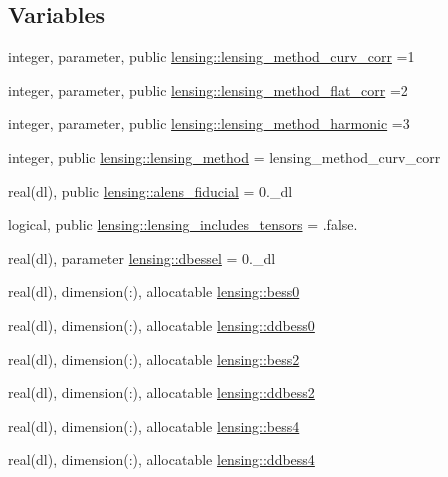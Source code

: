 \subsection*{Variables}
\begin{DoxyCompactItemize}
\item 
integer, parameter, public \mbox{\hyperlink{namespacelensing_a7f44051d5173429e3e2261d44e4b47f8}{lensing\+::lensing\+\_\+method\+\_\+curv\+\_\+corr}} =1
\item 
integer, parameter, public \mbox{\hyperlink{namespacelensing_a8104e288b73af5ec7004643639d08798}{lensing\+::lensing\+\_\+method\+\_\+flat\+\_\+corr}} =2
\item 
integer, parameter, public \mbox{\hyperlink{namespacelensing_a0af93cd038a1a553e2edc7e49c39f4d9}{lensing\+::lensing\+\_\+method\+\_\+harmonic}} =3
\item 
integer, public \mbox{\hyperlink{namespacelensing_a3710bc1b92b6fd87d6e8c1256f0a46bb}{lensing\+::lensing\+\_\+method}} = lensing\+\_\+method\+\_\+curv\+\_\+corr
\item 
real(dl), public \mbox{\hyperlink{namespacelensing_a3a5d51bfc096d14582dbf48fc094ffee}{lensing\+::alens\+\_\+fiducial}} = 0.\+\_\+dl
\item 
logical, public \mbox{\hyperlink{namespacelensing_acdb3e1d4390cc8b027cd17aeb1669c93}{lensing\+::lensing\+\_\+includes\+\_\+tensors}} = .false.
\item 
real(dl), parameter \mbox{\hyperlink{namespacelensing_a4f43eba14b18981f0f0bff9a117122fe}{lensing\+::dbessel}} = 0.\+\_\+dl
\item 
real(dl), dimension(\+:), allocatable \mbox{\hyperlink{namespacelensing_aedcd5bd61cd6f457b30a9197a6a8c49c}{lensing\+::bess0}}
\item 
real(dl), dimension(\+:), allocatable \mbox{\hyperlink{namespacelensing_aaa35de68ce5b9c6b986ebdf536468c80}{lensing\+::ddbess0}}
\item 
real(dl), dimension(\+:), allocatable \mbox{\hyperlink{namespacelensing_a2d7ff26f68bd68d466d651f07fd262fd}{lensing\+::bess2}}
\item 
real(dl), dimension(\+:), allocatable \mbox{\hyperlink{namespacelensing_a18c643c5ab84df5ac5f56ee6d426ffa7}{lensing\+::ddbess2}}
\item 
real(dl), dimension(\+:), allocatable \mbox{\hyperlink{namespacelensing_a835b869aac1268a3e5f6dea95667740b}{lensing\+::bess4}}
\item 
real(dl), dimension(\+:), allocatable \mbox{\hyperlink{namespacelensing_a1f5bffd45d988c4c941031621cd0c266}{lensing\+::ddbess4}}

\end{DoxyCompactItemize}
